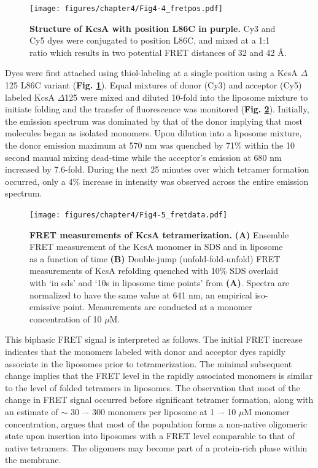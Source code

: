 \begin{figure}[!ht]
\begin{center}
	\texttt{[image: figures/chapter4/Fig4-4\_fretpos.pdf]}
\end{center}
	\caption{\textbf{Structure of KcsA with position L86C in purple.} Cy3 and Cy5 dyes were conjugated to position L86C, and mixed at a 1:1 ratio which results in two potential FRET distances of 32 and 42 Å.}
	\label{fig:ch4_f5}
\end{figure}

Dyes were first attached using thiol-labeling at a single position using a KcsA $\Delta$125 L86C variant (\textbf{Fig. \ref{fig:ch4_f5}}). Equal mixtures of donor (Cy3) and acceptor (Cy5) labeled KcsA $\Delta$125 were mixed and diluted 10-fold into the liposome mixture to initiate folding and the transfer of fluorescence was monitored (\textbf{Fig. \ref{fig:ch4_f6}}). Initially, the emission spectrum was dominated by that of the donor implying that most molecules began as isolated monomers. Upon dilution into a liposome mixture, the donor emission maximum at 570 nm was quenched by 71\% within the 10 second manual mixing dead-time while the acceptor’s emission at 680 nm increased by 7.6-fold. During the next 25 minutes over which tetramer formation occurred, only a 4\% increase in intensity was observed across the entire emission spectrum. 

\begin{figure}[!ht]
\begin{center}
	\texttt{[image: figures/chapter4/Fig4-5\_fretdata.pdf]}
\end{center}
	\caption{\textbf{FRET measurements of KcsA tetramerization.} \textbf{(A)} Ensemble FRET measurement of the KcsA monomer in SDS and in liposome as a function of time \textbf{(B)} Double-jump (unfold-fold-unfold) FRET measurements of KcsA refolding quenched with 10\% SDS overlaid with ‘in sds’ and ‘10s in liposome time points’ from \textbf{(A)}. Spectra are normalized to have the same value at 641 nm, an empirical iso-emissive point. Measurements are conducted at a monomer concentration of 10 $\mu$M.}
	\label{fig:ch4_f6}
\end{figure}

This biphasic FRET signal is interpreted as follows. The initial FRET increase indicates that the monomers labeled with donor and acceptor dyes rapidly associate in the liposomes prior to tetramerization. The minimal subsequent change implies that the FRET level in the rapidly associated monomers is similar to the level of folded tetramers in liposomes. The observation that most of the change in FRET signal occurred before significant tetramer formation, along with an estimate of $\sim$ 30 –- 300 monomers per liposome at 1 –- 10 $\mu$M monomer concentration, argues that most of the population forms a non-native oligomeric state upon insertion into liposomes with a FRET level comparable to that of native tetramers. The oligomers may become part of a protein-rich phase within the membrane.

